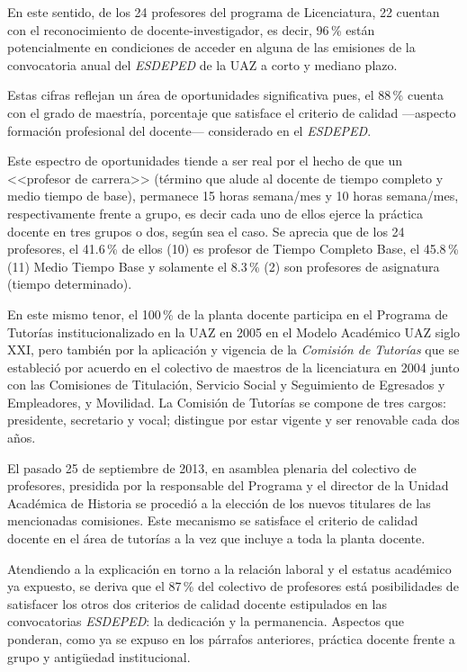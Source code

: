  
En este sentido, de los 24 profesores del programa de Licenciatura, 22
cuentan con el reconocimiento de docente-investigador, es decir, 96\,\% están
potencialmente en condiciones de acceder en alguna de las emisiones de la
convocatoria anual del \textit{ESDEPED} de la UAZ a corto y mediano plazo. 


 
Estas cifras reflejan un área de oportunidades significativa pues, el 88\,\%
cuenta con el grado de maestría, porcentaje que satisface el criterio de
calidad ---aspecto formación profesional del docente--- considerado en el
\textit{ESDEPED}. 

 
Este espectro de oportunidades tiende a ser real por el hecho de que un
<<profesor de carrera>> (término que alude al docente de tiempo completo y
medio tiempo de base),  permanece 15 horas semana\slash{}mes y 10 horas 
semana\slash{}mes, respectivamente frente a grupo, es decir cada uno de ellos ejerce la
práctica docente en tres grupos o dos, según sea el caso. Se aprecia que de
los 24 profesores, el 41.6\,\% de ellos (10) es profesor de Tiempo Completo
Base, el 45.8\,\% (11) Medio Tiempo Base y solamente el 8.3\,\% (2) son
profesores de asignatura (tiempo determinado). 

 
En este mismo tenor, el 100\,\% de la planta docente participa en el Programa
de Tutorías institucionalizado en la UAZ en 2005 en el Modelo Académico UAZ
siglo XXI, pero también por la aplicación y vigencia de la \textit{Comisión
de Tutorías} que se estableció por acuerdo en el colectivo de maestros de
la licenciatura en 2004 junto con las Comisiones de Titulación, Servicio
Social y Seguimiento de Egresados y Empleadores, y Movilidad. La Comisión
de Tutorías se compone de tres cargos: presidente, secretario y vocal;
distingue por estar vigente y ser renovable cada dos años. 
\enlargethispage{1\baselineskip}
 
El pasado 25 de septiembre de 2013, en asamblea plenaria del colectivo de
profesores, presidida por la responsable del Programa y el director de la
Unidad Académica de Historia se procedió a la elección de los nuevos
titulares de las mencionadas comisiones. Este mecanismo se satisface el
criterio de calidad docente en el área de tutorías a la vez que incluye a
toda la planta docente. 

 
Atendiendo a la explicación en torno a la relación laboral y el estatus
académico ya expuesto, se deriva que el 87\,\% del colectivo de profesores
está posibilidades de satisfacer los otros dos criterios de calidad docente
estipulados en las convocatorias \textit{ESDEPED}: la dedicación y la
permanencia. Aspectos que ponderan, como ya se expuso en los párrafos
anteriores, práctica docente frente a grupo y antigüedad institucional.

